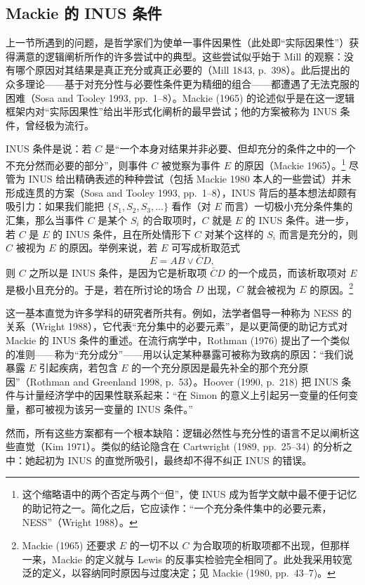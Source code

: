 \subsection{Mackie 的 INUS 条件}

上一节所遇到的问题，是哲学家们为使单一事件因果性（此处即“实际因果性”）获得满意的逻辑阐析所作的许多尝试中的典型。这些尝试似乎始于 Mill 的观察：没有哪个原因对其结果是真正充分或真正必要的（Mill 1843, p.~398）。此后提出的众多理论——基于对充分性与必要性条件更为精细的组合——都遭遇了无法克服的困难（Sosa and Tooley 1993, pp.~1--8）。Mackie (1965) 的论述似乎是在这一逻辑框架内对“实际因果性”给出半形式化阐析的最早尝试；他的方案被称为 INUS 条件，曾经极为流行。

INUS 条件是说：若 $C$ 是“一个本身对结果并非必要、但却充分的条件之中的一个不充分然而必要的部分”，则事件 $C$ 被觉察为事件 $E$ 的原因（Mackie 1965）。\footnote{这个缩略语中的两个否定与两个“但”，使 INUS 成为哲学文献中最不便于记忆的助记符之一。简化之后，它应读作：“一个充分条件集中的必要元素，NESS”（Wright 1988）。} 尽管为 INUS 给出精确表述的种种尝试（包括 Mackie 1980 本人的一些尝试）并未形成连贯的方案（Sosa and Tooley 1993, pp.~1--8），INUS 背后的基本想法却颇有吸引力：如果我们能把 $\{S_1,S_2,S_3,\dots\}$ 看作（对 $E$ 而言）一切极小充分条件集的汇集，那么当事件 $C$ 是某个 $S_i$ 的合取项时，$C$ 就是 $E$ 的 INUS 条件。进一步，若 $C$ 是 $E$ 的 INUS 条件，且在所处情形下 $C$ 对某个这样的 $S_i$ 而言是充分的，则 $C$ 被视为 $E$ 的原因。举例来说，若 $E$ 可写成析取范式
\[
E=AB\vee \bar C D,
\]
则 $C$ 之所以是 INUS 条件，是因为它是析取项 $\bar C D$ 的一个成员，而该析取项对 $E$ 是极小且充分的。于是，若在所讨论的场合 $D$ 出现，$C$ 就会被视为 $E$ 的原因。\footnote{Mackie (1965) 还要求 $E$ 的一切不以 $C$ 为合取项的析取项都不出现，但那样一来，Mackie 的定义就与 Lewis 的反事实检验完全相同了。此处我采用较宽泛的定义，以容纳同时原因与过度决定；见 Mackie (1980, pp.~43--7)。}

这一基本直觉为许多学科的研究者所共有。例如，法学者倡导一种称为 NESS 的关系（Wright 1988），它代表“充分集中的必要元素”，是以更简便的助记方式对 Mackie 的 INUS 条件的重述。在流行病学中，Rothman (1976) 提出了一个类似的准则——称为“充分成分”——用以认定某种暴露可被称为致病的原因：“我们说暴露 $E$ 引起疾病，若包含 $E$ 的一个充分原因是最先补全的那个充分原因”（Rothman and Greenland 1998, p.~53）。Hoover (1990, p.~218) 把 INUS 条件与计量经济学中的因果性联系起来：“在 Simon 的意义上引起另一变量的任何变量，都可被视为该另一变量的 INUS 条件。”

然而，所有这些方案都有一个根本缺陷：逻辑必然性与充分性的语言不足以阐析这些直觉（Kim 1971）。类似的结论隐含在 Cartwright (1989, pp.~25--34) 的分析之中：她起初为 INUS 的直觉所吸引，最终却不得不纠正 INUS 的错误。

